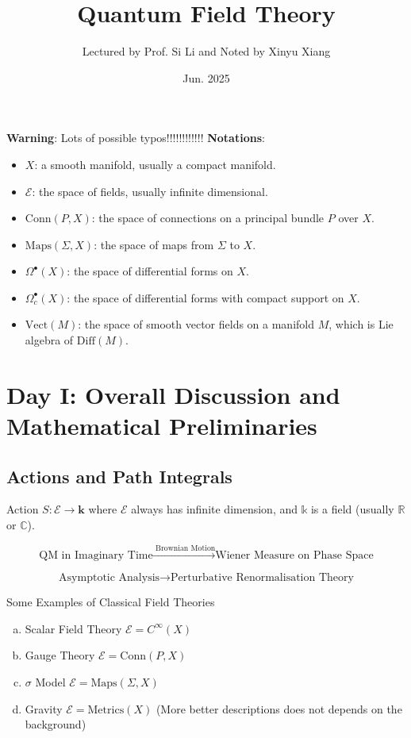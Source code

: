 \documentclass[10pt]{article}
\title{\textbf{Quantum Field Theory}}
\author{Lectured by Prof. Si Li and Noted by Xinyu Xiang}
\date{Jun. 2025}
\begin{document}
\maketitle

\textbf{Warning}: Lots of possible typos!!!!!!!!!!!!
\textbf{Notations}:
\begin{itemize}
  \item $ X$: a smooth manifold, usually a compact manifold.
  \item $ \mathcal{E}$: the space of fields, usually infinite dimensional.
  \item $ \mathrm{Conn}(P,X)$: the space of connections on a principal bundle $ P$ over $ X$.
  \item $ \text{Maps}(\Sigma, X)$: the space of maps from $\Sigma$ to $ X$.
  \item $ \Omega^{\bullet}(X)$: the space of differential forms on $ X$.
  \item $ \Omega^{\bullet}_{c}(X)$: the space of differential forms with compact support on $ X$.
  \item $ \mathrm{Vect}(M)$: the space of smooth vector fields on a manifold $ M$, which is Lie algebra of $ \mathrm{Diff}(M)$.
\end{itemize}

\section{Day I: Overall Discussion and Mathematical Preliminaries}

\subsection{Actions and Path Integrals}

Action $ S: \mathcal{E} \rightarrow \mathbf{k}$ where $ \mathcal{E}$ always has infinite dimension, and $ \mathbb{k}$ is a field (usually $ \mathbb{R}$ or $ \mathbb{C}$).

\begin{equation*}
  \text{QM in Imaginary Time} \xrightarrow{\text{ Brownian Motion}} \text{Wiener Measure on Phase Space}
\end{equation*}

\begin{equation*}
  \text{Asymptotic Analysis} \xrightarrow{\quad} \text{Perturbative Renormalisation Theory}
\end{equation*}

\begin{example} Some Examples of Classical Field Theories
  \begin{enumerate}[(a)]
    \item Scalar Field Theory $ \mathcal{E} = C^{\infty }(X)$
    \item Gauge Theory $ \mathcal{E} = \mathrm{Conn}(P,X)$
    \item $ \sigma$ Model $ \mathcal{E} = \text{Maps}(\Sigma, X)$
    \item Gravity $ \mathcal{E} = \text{Metrics}(X)$ (More better descriptions does not depends on the background)
  \end{enumerate}
\end{example}
\end{document}
